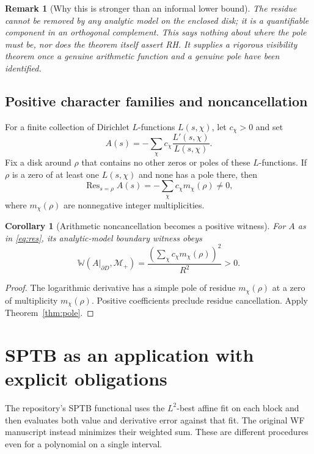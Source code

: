 \documentclass[11pt,letterpaper]{article}
\newtheorem{corollary}[theorem]{Corollary}
\newtheorem{remark}[theorem]{Remark}
\newcommand{\MM}{\mathcal M}
\newcommand{\WW}{\mathbb W}
\begin{document}
\begin{remark}[Why this is stronger than an informal lower bound]
The residue cannot be removed by any analytic model on the enclosed disk; it is a quantifiable component in an orthogonal complement. This says nothing about \emph{where} the pole must be, nor does the theorem itself assert RH. It supplies a rigorous visibility theorem once a genuine arithmetic function and a genuine pole have been identified.
\end{remark}

\subsection{Positive character families and noncancellation}
For a finite collection of Dirichlet $L$-functions $L(s,\chi)$, let $c_\chi>0$ and set
\[
A(s)=-\sum_\chi c_\chi\frac{L'(s,\chi)}{L(s,\chi)}.
\]
Fix a disk around $\rho$ that contains no other zeros or poles of these $L$-functions. If $\rho$ is a zero of at least one $L(s,\chi)$ and none has a pole there, then
\begin{equation}\label{eq:res}
\operatorname{Res}_{s=\rho} A(s)=-\sum_\chi c_\chi m_\chi(\rho)\ne0,
\end{equation}
where $m_\chi(\rho)$ are nonnegative integer multiplicities.

\begin{corollary}[Arithmetic noncancellation becomes a positive witness]\label{cor:arithmetic}
For $A$ as in \eqref{eq:res}, its analytic-model boundary witness obeys
\[
\WW(A|_{\partial D},\MM_+)=\frac{\left(\sum_\chi c_\chi m_\chi(\rho)\right)^2}{R^2}>0.
\]
\end{corollary}
\begin{proof}
The logarithmic derivative has a simple pole of residue $m_\chi(\rho)$ at a zero of multiplicity $m_\chi(\rho)$. Positive coefficients preclude residue cancellation. Apply Theorem~\ref{thm:pole}.
\end{proof}


\section{SPTB as an application with explicit obligations}\label{sec:sptb}
The repository's SPTB functional \cite{sptbrepo} uses the $L^2$-best affine
fit on each block and then evaluates both value and derivative error
against that fit. The original WF manuscript instead minimizes their
weighted sum. These are different procedures even for a polynomial
on a single interval.
\end{document}
